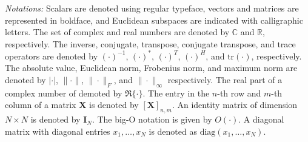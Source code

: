 \emph{Notations:} Scalars are denoted using regular typeface, vectors and matrices are represented in boldface, and Euclidean subspaces are indicated with calligraphic letters. The set of complex and real numbers are denoted by $\mathbb{C}$ and $\mathbb{R}$, respectively. The inverse, conjugate, transpose, conjugate transpose, and trace operators are denoted by $(\cdot)^{-1}$, $(\cdot)^*$, $(\cdot)^T$, $(\cdot)^H$, and $\mathrm{tr}(\cdot)$, respectively. The absolute value, Euclidean norm, Frobenius norm, and maximum norm are denoted by $|\cdot|$, $\|\cdot\|$, $\|\cdot\|_F$, and $\|\cdot\|_\infty$ respectively. The real part of a complex number of demoted by $\Re \{\cdot\}$. The entry in the $n$-th row and $m$-th column of a matrix $\mathbf{X}$ is denoted by $[\mathbf{X}]_{n,m}$. An identity matrix of dimension $N \times N$ is denoted by $\mathbf{I}_N$. The big-O notation is given by $O(\cdot)$. A diagonal matrix with diagonal entries $x_1,\dots,x_N$ is denoted as $\mathrm{diag}(x_1,\dots,x_N)$.    





